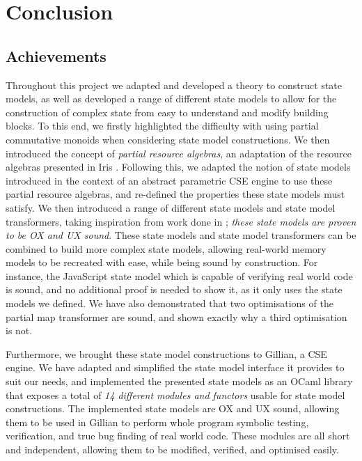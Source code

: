 \chapter{Conclusion} \label{chap:conclusion}

\section{Achievements}

Throughout this project we adapted and developed a theory to construct state models, as well as developed a range of different state models to allow for the construction of complex state from easy to understand and modify building blocks. To this end, we firstly highlighted the difficulty with using partial commutative monoids when considering state model constructions. We then introduced the concept of \emph{partial resource algebras}, an adaptation of the resource algebras presented in Iris \cite{iris}. Following this, we adapted the notion of state models introduced in the context of an abstract parametric CSE engine \cite{cse2} to use these partial resource algebras, and re-defined the properties these state models must satisfy. We then introduced a range of different state models and state model transformers, taking inspiration from work done in \cite{iris,sacha-phd}; \emph{these state models are proven to be OX and UX sound}. These state models and state model transformers can be combined to build more complex state models, allowing real-world memory models to be recreated with ease, while being sound by construction. For instance, the JavaScript state model which is capable of verifying real world code is sound, and no additional proof is needed to show it, as it only uses the state models we defined. We have also demonstrated that two optimisations of the partial map transformer are sound, and shown exactly why a third optimisation is not.

Furthermore, we brought these state model constructions to Gillian, a CSE engine. We have adapted and simplified the state model interface it provides to suit our needs, and implemented the presented state models as an OCaml library that exposes a total of \emph{14 different modules and functors} usable for state model constructions. The implemented state models are OX and UX sound, allowing them to be used in Gillian to perform whole program symbolic testing, verification, and true bug finding of real world code. These modules are all short and independent, allowing them to be modified, verified, and optimised easily.

